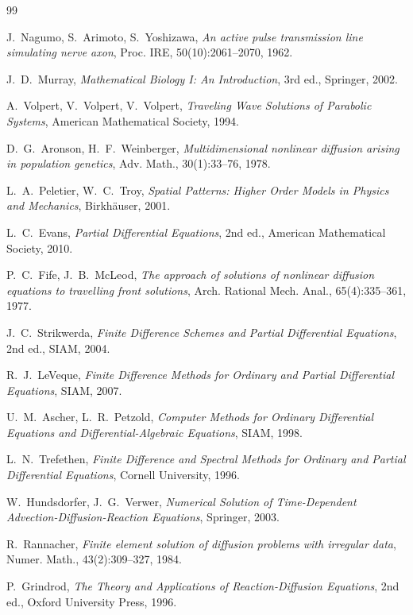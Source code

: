 \documentclass[11pt,a4paper]{report}
\begin{document}
\begin{thebibliography}{99}

J.~Nagumo, S.~Arimoto, S.~Yoshizawa,
\textit{An active pulse transmission line simulating nerve axon},
Proc. IRE, 50(10):2061--2070, 1962.

J.~D.~Murray,
\textit{Mathematical Biology I: An Introduction},
3rd ed., Springer, 2002.

A.~Volpert, V.~Volpert, V.~Volpert,
\textit{Traveling Wave Solutions of Parabolic Systems},
American Mathematical Society, 1994.

D.~G.~Aronson, H.~F.~Weinberger,
\textit{Multidimensional nonlinear diffusion arising in population genetics},
Adv. Math., 30(1):33--76, 1978.

L.~A.~Peletier, W.~C.~Troy,
\textit{Spatial Patterns: Higher Order Models in Physics and Mechanics},
Birkh\"auser, 2001.

L.~C.~Evans,
\textit{Partial Differential Equations},
2nd ed., American Mathematical Society, 2010.

P.~C.~Fife, J.~B.~McLeod,
\textit{The approach of solutions of nonlinear diffusion equations to
travelling front solutions},
Arch. Rational Mech. Anal., 65(4):335--361, 1977.

J.~C.~Strikwerda,
\textit{Finite Difference Schemes and Partial Differential Equations},
2nd ed., SIAM, 2004.

R.~J.~LeVeque,
\textit{Finite Difference Methods for Ordinary and Partial Differential Equations},
SIAM, 2007.

U.~M.~Ascher, L.~R.~Petzold,
\textit{Computer Methods for Ordinary Differential Equations and
Differential-Algebraic Equations},
SIAM, 1998.

L.~N.~Trefethen,
\textit{Finite Difference and Spectral Methods for Ordinary and
Partial Differential Equations},
Cornell University, 1996.

W.~Hundsdorfer, J.~G.~Verwer,
\textit{Numerical Solution of Time-Dependent Advection-Diffusion-Reaction Equations},
Springer, 2003.

R.~Rannacher,
\textit{Finite element solution of diffusion problems with irregular data},
Numer. Math., 43(2):309--327, 1984.

P.~Grindrod,
\textit{The Theory and Applications of Reaction-Diffusion Equations},
2nd ed., Oxford University Press, 1996.

\end{thebibliography}
\end{document}
